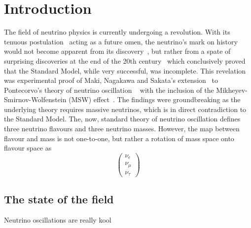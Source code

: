\chapter{Introduction}
\label{chap:Introduction}


The field of neutrino physics is currently undergoing a revolution.  With its tenuous postulation~\cite{PauliOpenLetter} acting as a future omen, the neutrino's mark on history would not become apparent from its discovery~\cite{Cowan20071956, PhysRevLett.9.36, Kodama2001218}, but rather from a spate of surprising discoveries at the end of the 20th century~\cite{PhysRevLett.81.1562, PhysRevLett.87.071301, PhysRevLett.90.021802} which conclusively proved that the Standard Model, while very successful, was incomplete.  This revelation was experimental proof of Maki, Nagakawa and Sakata's extension~\cite{Maki01111962} to Pontecorvo's theory of neutrino oscillation ~\cite{Pontecorvo} with the inclusion of the Mikheyev-Smirnov-Wolfenstein (MSW) effect~\cite{PhysRevD.17.2369,Mikheev:1986gs}.  The findings were groundbreaking as the underlying theory requires massive neutrinos, which is in direct contradiction to the Standard Model.  The, now, standard theory of neutrino oscillation defines three neutrino flavours and three neutrino masses.  However, the map between flavour and mass is not one-to-one, but rather a rotation of mass space onto flavour space as
\begin{equation}
\begin{pmatrix}
\nu_e \\
    \nu_\mu \\
    \nu_\tau
\end{pmatrix}
\end{equation}

\section{The state of the field}
\label{sec:StateOfTheField}
Neutrino oscillations are really kool
